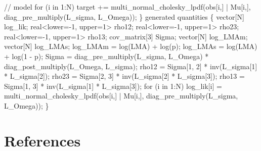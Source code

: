\documentclass[
  12pt,
  letterpaper,
  DIV=11,
  numbers=noendperiod]{scrartcl}
\newenvironment{Shaded}{\begin{snugshade}}{\end{snugshade}}
\newcommand{\CommentTok}[1]{\textcolor[rgb]{0.37,0.37,0.37}{#1}}
\newcommand{\ControlFlowTok}[1]{\textcolor[rgb]{0.00,0.23,0.31}{#1}}
\newcommand{\DataTypeTok}[1]{\textcolor[rgb]{0.68,0.00,0.00}{#1}}
\newcommand{\DecValTok}[1]{\textcolor[rgb]{0.68,0.00,0.00}{#1}}
\newcommand{\KeywordTok}[1]{\textcolor[rgb]{0.00,0.23,0.31}{#1}}
\newcommand{\NormalTok}[1]{\textcolor[rgb]{0.00,0.23,0.31}{#1}}
\begin{document}
\begin{Shaded}
\begin{Highlighting}[]
  \CommentTok{// model}
  \ControlFlowTok{for}\NormalTok{ (i }\ControlFlowTok{in} \DecValTok{1}\NormalTok{:N)}
     \KeywordTok{target +=}\NormalTok{ multi\_normal\_cholesky\_lpdf(obs[i,] | Mu[i,], diag\_pre\_multiply(L\_sigma, L\_Omega));}
\NormalTok{\}}
\KeywordTok{generated quantities}\NormalTok{ \{}
  \DataTypeTok{vector}\NormalTok{[N] log\_lik;}
  \DataTypeTok{real}\NormalTok{\textless{}}\KeywordTok{lower}\NormalTok{={-}}\DecValTok{1}\NormalTok{, }\KeywordTok{upper}\NormalTok{=}\DecValTok{1}\NormalTok{\textgreater{} rho12;}
  \DataTypeTok{real}\NormalTok{\textless{}}\KeywordTok{lower}\NormalTok{={-}}\DecValTok{1}\NormalTok{, }\KeywordTok{upper}\NormalTok{=}\DecValTok{1}\NormalTok{\textgreater{} rho23;}
  \DataTypeTok{real}\NormalTok{\textless{}}\KeywordTok{lower}\NormalTok{={-}}\DecValTok{1}\NormalTok{, }\KeywordTok{upper}\NormalTok{=}\DecValTok{1}\NormalTok{\textgreater{} rho13;}
  \DataTypeTok{cov\_matrix}\NormalTok{[}\DecValTok{3}\NormalTok{] Sigma;}
  \DataTypeTok{vector}\NormalTok{[N] log\_LMAm;}
  \DataTypeTok{vector}\NormalTok{[N] log\_LMAs;}
\NormalTok{  log\_LMAm = log(LMA) + log(p);}
\NormalTok{  log\_LMAs = log(LMA) + log(}\DecValTok{1}\NormalTok{ {-} p);}
\NormalTok{  Sigma = diag\_pre\_multiply(L\_sigma, L\_Omega)}
\NormalTok{     * diag\_post\_multiply(L\_Omega\textquotesingle{}, L\_sigma);}
\NormalTok{  rho12 = Sigma[}\DecValTok{1}\NormalTok{, }\DecValTok{2}\NormalTok{] * inv(L\_sigma[}\DecValTok{1}\NormalTok{] * L\_sigma[}\DecValTok{2}\NormalTok{]);}
\NormalTok{  rho23 = Sigma[}\DecValTok{2}\NormalTok{, }\DecValTok{3}\NormalTok{] * inv(L\_sigma[}\DecValTok{2}\NormalTok{] * L\_sigma[}\DecValTok{3}\NormalTok{]);}
\NormalTok{  rho13 = Sigma[}\DecValTok{1}\NormalTok{, }\DecValTok{3}\NormalTok{] * inv(L\_sigma[}\DecValTok{1}\NormalTok{] * L\_sigma[}\DecValTok{3}\NormalTok{]);}
  \ControlFlowTok{for}\NormalTok{ (i }\ControlFlowTok{in} \DecValTok{1}\NormalTok{:N)}
\NormalTok{   log\_lik[i] = multi\_normal\_cholesky\_lpdf(obs[i,] | Mu[i,], diag\_pre\_multiply(L\_sigma, L\_Omega));}
\NormalTok{ \}}
\end{Highlighting}
\end{Shaded}

\hypertarget{references}{%
\section*{References}\label{references}}
\end{document}
